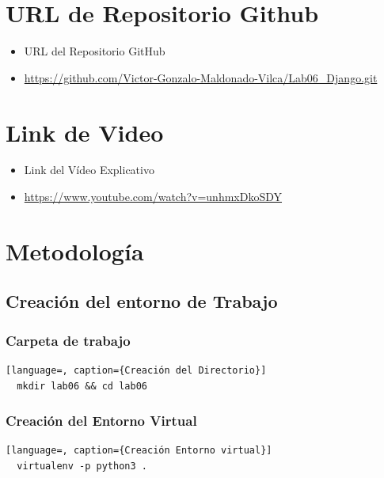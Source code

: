\documentclass{article}
\begin{document}

  \section{URL de Repositorio Github}
  \begin{itemize}
    \item URL del Repositorio GitHub
    \item \url{https://github.com/Victor-Gonzalo-Maldonado-Vilca/Lab06_Django.git}
  \end{itemize}
  

	\section{Link de Video}
  \begin{itemize}
    \item Link del Vídeo Explicativo
    \item \url{https://www.youtube.com/watch?v=unhmxDkoSDY}
  \end{itemize}


  \section{Metodología}


  \subsection{Creación del entorno de Trabajo}
  

  \subsubsection{Carpeta de trabajo}
  \begin{lstlisting}[language=, caption={Creación del Directorio}]
  mkdir lab06 && cd lab06
  \end{lstlisting}
  

  \subsubsection{Creación del Entorno Virtual}
  \begin{lstlisting}[language=, caption={Creación Entorno virtual}]
  virtualenv -p python3 .
  \end{lstlisting}
  \newpage
  
\end{document}
